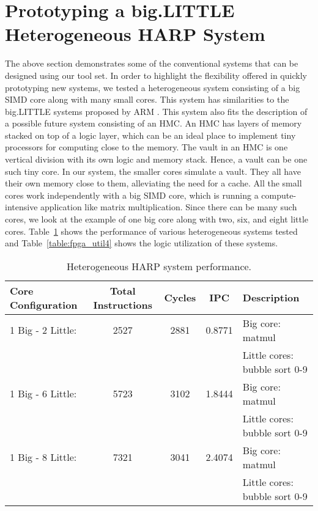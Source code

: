 \section{Prototyping a big.LITTLE Heterogeneous HARP System}
The above section demonstrates some of the conventional systems that can be designed using our tool set. In order to highlight the flexibility offered in quickly prototyping new systems, we tested a heterogeneous system consisting of a big SIMD core along with many small cores. This system has similarities to the big.LITTLE systems proposed by ARM \cite{biglittle}. This system also fits the description of a possible future system consisting of an HMC. An HMC has layers of memory stacked on top of a logic layer, which can be an ideal place to implement tiny processors for computing close to the memory. The vault in an HMC is one vertical division with its own logic and memory stack. Hence, a vault can be one such tiny core. In our system, the smaller cores simulate a vault. They all have their own memory close to them, alleviating the need for a cache. All the small cores work independently with a big SIMD core, which is running a compute-intensive application like matrix multiplication. Since there can be many such cores, we look at the example of one big core along with two, six, and eight little cores. Table~\ref{table:perf4} shows the performance of various heterogeneous systems tested and Table~\ref{table:fpga_util4} shows the logic utilization of these systems.

\begin{table}[!htbp]
  \centering
  \caption{Heterogeneous HARP system performance.}
  \begin{tabular}{|l|c|c|c|l|}
    \hline
Core Configuration		&Total Instructions 	&Cycles		&IPC		&Description\\
    \hline
1 Big - 2 Little:		&2527 	&2881		&0.8771 	&Big core: matmul\\
								&			&			&			&Little cores: bubble sort 0-9\\
\hline
1 Big - 6 Little:		&5723 	&3102		&1.8444 	&Big core: matmul\\
								&			&			&			&Little cores: bubble sort 0-9\\
\hline
1 Big - 8 Little:		&7321		&3041		&2.4074 	&Big core: matmul\\
								&			&			&			&Little cores: bubble sort 0-9\\
    \hline
  \end{tabular}
  \label{table:perf4}
\end{table}

